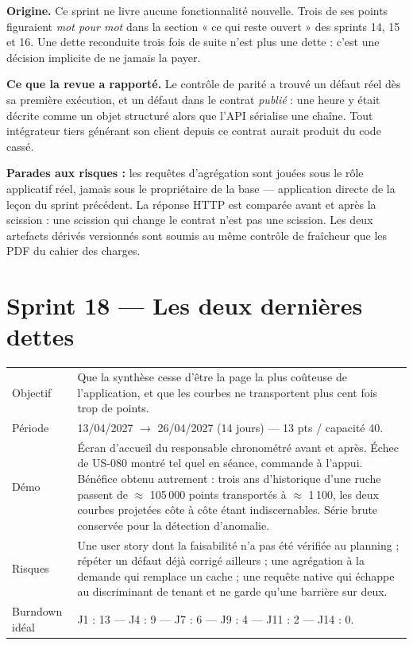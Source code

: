\textbf{Origine.} Ce sprint ne livre aucune fonctionnalité nouvelle. Trois de
ses points figuraient \emph{mot pour mot} dans la section « ce qui reste
ouvert » des sprints 14, 15 et 16. Une dette reconduite trois fois de suite
n'est plus une dette : c'est une décision implicite de ne jamais la payer.

\textbf{Ce que la revue a rapporté.} Le contrôle de parité a trouvé un défaut
réel dès sa première exécution, et un défaut dans le contrat \emph{publié} : une
heure y était décrite comme un objet structuré alors que l'API sérialise une
chaîne. Tout intégrateur tiers générant son client depuis ce contrat aurait
produit du code cassé.

\textbf{Parades aux risques :} les requêtes d'agrégation sont jouées sous le
rôle applicatif réel, jamais sous le propriétaire de la base --- application
directe de la leçon du sprint précédent. La réponse HTTP est comparée avant et
après la scission : une scission qui change le contrat n'est pas une scission.
Les deux artefacts dérivés versionnés sont soumis au même contrôle de fraîcheur
que les PDF du cahier des charges.

\section{Sprint 18 --- Les deux dernières dettes}

\begin{center}
\begin{tabular}{lp{11cm}}
\toprule
Objectif  & Que la synthèse cesse d'être la page la plus coûteuse de
            l'application, et que les courbes ne transportent plus cent fois trop
            de points. \\
Période   & 13/04/2027 $\rightarrow$ 26/04/2027 (14 jours) --- 13 pts / capacité 40. \\
Démo      & Écran d'accueil du responsable chronométré avant et après. Échec de
            US-080 montré tel quel en séance, commande à l'appui. Bénéfice obtenu
            autrement : trois ans d'historique d'une ruche passent de
            $\approx$ 105\,000 points transportés à $\approx$ 1\,100, les deux
            courbes projetées côte à côte étant indiscernables. Série brute
            conservée pour la détection d'anomalie. \\
Risques   & Une user story dont la faisabilité n'a pas été vérifiée au planning ;
            répéter un défaut déjà corrigé ailleurs ; une agrégation à la demande
            qui remplace un cache ; une requête native qui échappe au discriminant
            de tenant et ne garde qu'une barrière sur deux. \\
Burndown idéal & J1 : 13 --- J4 : 9 --- J7 : 6 --- J9 : 4 --- J11 : 2 --- J14 : 0. \\
\bottomrule
\end{tabular}
\end{center}

